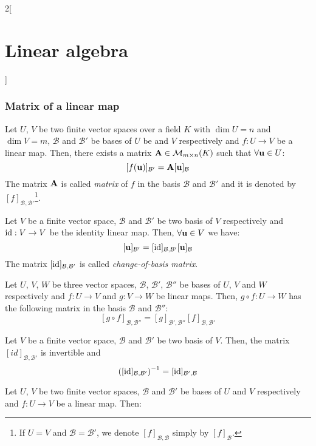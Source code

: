 \documentclass[../../../main.tex]{subfiles}
\begin{document}
\begin{multicols}{2}[\section{Linear algebra}]
  \subsubsection{Matrix of a linear map}
  \begin{prop}
    Let $U$, $V$ be two finite vector spaces over a field $K$ with $\dim U=n$ and $\dim V=m$, $\mathcal{B}$ and $\mathcal{B}'$ be bases of $U$ be and $V$ respectively and $f:U\rightarrow V$ be a linear map. Then, there exists a matrix $\boldsymbol{\mathrm{A}}\in\mathcal{M}_{m\times n}(K)$ such that $\forall\boldsymbol{\mathrm{u}}\in U$: $$[f(\boldsymbol{\mathrm{u}})]_{\mathcal{B}'}=\boldsymbol{\mathrm{A}}[\boldsymbol{\mathrm{u}}]_\mathcal{B}$$
    The matrix $\boldsymbol{\mathrm{A}}$ is called \emph{matrix} of $f$ in the basis $\mathcal{B}$ and $\mathcal{B}'$ and it is denoted by $[f]_{\mathcal{B},\mathcal{B}'}$\footnote{If $U=V$ and $\mathcal{B}=\mathcal{B}'$, we denote $[f]_{\mathcal{B},\mathcal{B}}$ simply by $[f]_{\mathcal{B}}$.}.
  \end{prop}
  \begin{corollary}
    Let $V$ be a finite vector space, $\mathcal{B}$ and $\mathcal{B}'$ be two basis of $V$ respectively and $\mathrm{id}:V\rightarrow V$ be the identity linear map. Then, $\forall\boldsymbol{\mathrm{u}}\in V$ we have: $$[\boldsymbol{\mathrm{u}}]_{\mathcal{B}'}=[\mathrm{id}]_{\mathcal{B},\mathcal{B}'}[\boldsymbol{\mathrm{u}}]_\mathcal{B}$$ The matrix $[\mathrm{id}]_{\mathcal{B},\mathcal{B}'}$ is called \emph{change-of-basis matrix}.
  \end{corollary}
  \begin{prop}
    Let $U$, $V$, $W$ be three vector spaces, $\mathcal{B}$, $\mathcal{B}'$, $\mathcal{B}''$ be bases of $U$, $V$ and $W$ respectively and $f:U\rightarrow V$ and $g:V\rightarrow W$ be linear maps. Then, $g\circ f:U\rightarrow W$ has the following matrix in the basis $\mathcal{B}$ and $\mathcal{B}''$: $$[g\circ f]_{\mathcal{B},\mathcal{B}''}=[g]_{\mathcal{B}',\mathcal{B}''}[f]_{\mathcal{B},\mathcal{B}'}$$
  \end{prop}
  \begin{corollary}
    Let $V$ be a finite vector space, $\mathcal{B}$ and $\mathcal{B}'$ be two basis of $V$. Then, the matrix $[id]_{\mathcal{B},\mathcal{B}'}$ is invertible and $${\left([\mathrm{id}]_{\mathcal{B},\mathcal{B}'}\right)}^{-1}=[\mathrm{id}]_{\mathcal{B}',\mathcal{B}}$$
  \end{corollary}
  \begin{corollary}
    Let $U$, $V$ be two finite vector spaces, $\mathcal{B}$ and $\mathcal{B}'$ be bases of $U$ and $V$ respectively and $f:U\rightarrow V$ be a linear map. Then:

\end{corollary}
\end{multicols}
\end{document}
